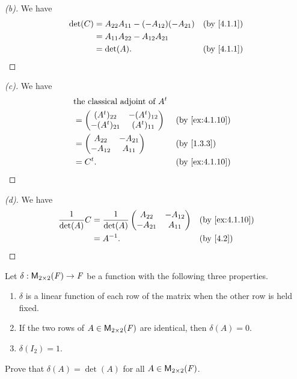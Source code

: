 \begin{proof}[(b)]
  We have
  \begin{align*}
    \det(C) & = A_{2 2} A_{1 1} - (-A_{1 2}) (-A_{2 1}) &  & \by{4.1.1} \\
            & = A_{1 1} A_{2 2} - A_{1 2} A_{2 1}                       \\
            & = \det(A).                                &  & \by{4.1.1}
  \end{align*}
\end{proof}

\begin{proof}[(c)]
  We have
  \begin{align*}
     & \text{the classical adjoint of } \tp{A}                     \\
     & = \begin{pmatrix}
           (\tp{A})_{2 2}  & -(\tp{A})_{1 2} \\
           -(\tp{A})_{2 1} & (\tp{A})_{1 1}
         \end{pmatrix}    &  & \by{ex:4.1.10}                      \\
     & = \begin{pmatrix}
           A_{2 2}  & -A_{2 1} \\
           -A_{1 2} & A_{1 1}
         \end{pmatrix}                  &  & \by{1.3.3}            \\
     & = \tp{C}.                               &  & \by{ex:4.1.10}
  \end{align*}
\end{proof}

\begin{proof}[(d)]
  We have
  \begin{align*}
    \dfrac{1}{\det(A)} C & = \dfrac{1}{\det(A)} \begin{pmatrix}
                                                  A_{2 2}  & -A_{1 2} \\
                                                  -A_{2 1} & A_{1 1}
                                                \end{pmatrix} &  & \by{ex:4.1.10} \\
                         & = A^{-1}.                            &  & \by{4.2}
  \end{align*}
\end{proof}

\begin{ex}\label{ex:4.1.11}
  Let \(\delta : \ms[2][2][\F] \to \F\) be a function with the following three properties.
  \begin{enumerate}
    \item \(\delta\) is a linear function of each row of the matrix when the other row is held fixed.
    \item If the two rows of \(A \in \ms[2][2][\F]\) are identical, then \(\delta(A) = 0\).
    \item \(\delta(I_2) = 1\).
  \end{enumerate}
  Prove that \(\delta(A) = \det(A)\) for all \(A \in \ms[2][2][\F]\).
\end{ex}

